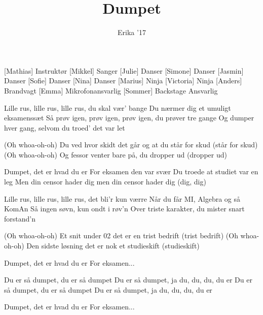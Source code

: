 \documentclass[a4paper,11pt]{article}
\title{Dumpet}
\author{Erika '17}
\begin{document}
\maketitle

\begin{roles}
[Mathias] Instruktør
[Mikkel] Sanger
[Julie] Danser
[Simone] Danser
[Jasmin] Danser
[Sofie] Danser
[Nina] Danser
[Marius] Ninja
[Victoria] Ninja
[Anders] Brandvagt
[Emma] Mikrofonansvarlig
[Sommer] Backstage Ansvarlig
\end{roles}

\begin{song}
 Lille rus, lille rus, lille rus, du skal vær' bange
Du nærmer dig et umuligt eksamenssæt
Så prøv igen, prøv igen, prøv igen, du prøver tre gange
Og dumper hver gang, selvom du troed' det var let

 (Oh whoa-oh-oh)
Du ved hvor skidt det går og at du står for skud (står for skud)
(Oh whoa-oh-oh)
Og fessor venter bare på, du dropper ud (dropper ud)

 Dumpet, det er hvad du er
For eksamen den var svær
Du troede at studiet var en leg
Men din censor hader dig
men din censor hader dig (dig, dig)

 Lille rus, lille rus, lille rus, det bli'r kun værre
Når du får MI, Algebra og så KomAn
Så ingen søvn, kun ondt i røv'n
Over triste karakter, du mister snart forstand'n

 (Oh whoa-oh-oh)
Et snit under 02 det er en trist bedrift (trist bedrift)
(Oh whoa-oh-oh)
Den sidste løsning det er nok et studieskift (studieskift)

 Dumpet, det er hvad du er
For eksamen...

 Du er så dumpet, du er så dumpet
Du er så dumpet, ja du, du, du, du er
Du er så dumpet, du er så dumpet
Du er så dumpet, ja du, du, du, du er

 Dumpet, det er hvad du er
For eksamen...
\end{song}
\end{document}
